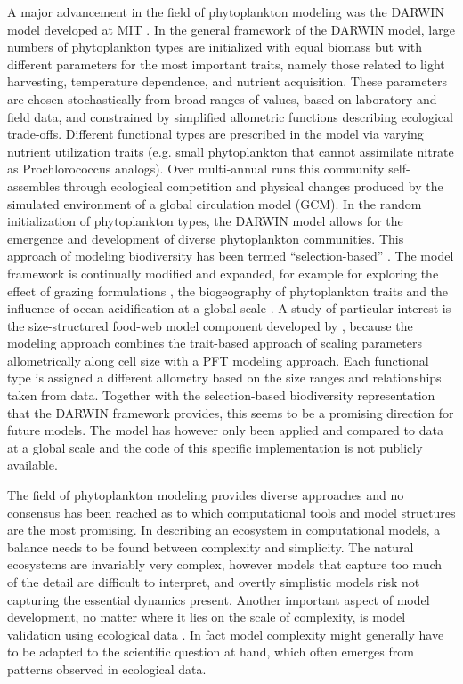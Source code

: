 A major advancement in the field of phytoplankton modeling was the DARWIN model developed at MIT \citep{Follows2007d}. In the general framework of the DARWIN model, large numbers of phytoplankton types are initialized with equal biomass but with different parameters for the most important traits, namely those related to light harvesting, temperature dependence, and nutrient acquisition. These parameters are chosen stochastically from broad ranges of values, based on laboratory and field data, and constrained by simplified allometric functions describing ecological trade-offs. Different functional types are prescribed in the model via varying nutrient utilization traits (e.g. small phytoplankton that cannot assimilate nitrate as Prochlorococcus analogs). Over multi-annual runs this community self-assembles through ecological competition and physical changes produced by the simulated environment of a global circulation model (GCM). In the random initialization of phytoplankton types, the DARWIN model allows for the emergence and development of diverse phytoplankton communities. This approach of modeling biodiversity has been termed “selection-based” \citep{Follows2011c}. The model framework is continually modified and expanded, for example for exploring the effect of grazing formulations \citep{Prowe2012c}, the biogeography of phytoplankton traits \citep{Barton2013} and the influence of ocean acidification at a global scale \citep{Dutkiewicz2015}. A study of particular interest is the size-structured food-web model component developed by \citet{Ward2012}, because the modeling approach combines the trait-based approach of scaling parameters allometrically along cell size with a PFT modeling approach. Each functional type is assigned a different allometry based on the size ranges and relationships taken from data. Together with the selection-based biodiversity representation that the DARWIN framework provides, this seems to be a promising direction for future models. The model has however only been applied and compared to data at a global scale and the code of this specific implementation is not publicly available. 

The field of phytoplankton modeling provides diverse approaches and no consensus has been reached as to which computational tools and model structures are the most promising. In describing an ecosystem in computational models, a balance needs to be found between complexity and simplicity. The natural ecosystems are invariably very complex, however models that capture too much of the detail are difficult to interpret, and overtly simplistic models risk not capturing the essential dynamics present. Another important aspect of model development, no matter where it lies on the scale of complexity, is model validation using ecological data \citep{RykielJr1996}. In fact model complexity might generally have to be adapted to the scientific question at hand, which often emerges from patterns observed in ecological data. 


